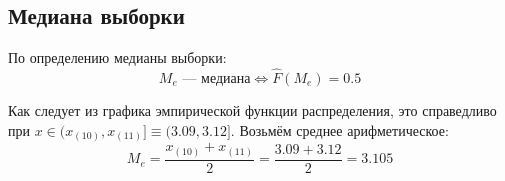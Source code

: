 \subsection{Медиана выборки}

По определению медианы выборки:
\[
    M_e\text{ --- медиана}\iff \hat{F}(M_e)=0.5
\]

Как следует из графика эмпирической функции распределения, это справедливо при \( x\in(x_{(10)},x_{(11)}]\equiv (3.09,3.12]\). Возьмём среднее арифметическое:
\[
    M_e = \frac{x_{(10)} + x_{(11)}}{2} = \frac{3.09 + 3.12}{2} = 3.105
\]